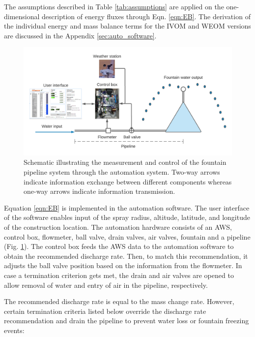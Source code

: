 The assumptions described in Table \ref{tab:assumptions} are applied on the one-dimensional description of
energy fluxes through Eqn. \ref{eqn:EB}. The derivation of the individual energy and mass balance terms for the
\ac{IVOM} and \ac{WEOM} versions are discussed in the Appendix \ref{sec:auto_software}.

\begin{figure}
\includegraphics[width=\linewidth]{figs/Automation_schematic.png}
\caption{Schematic illustrating the measurement and control of the fountain pipeline system through the
  automation system. Two-way arrows indicate information exchange between different components whereas one-way
  arrows indicate information transmission.}

\label{fig:auto_schematic} 
\end{figure}

Equation \ref{eqn:EB} is implemented in the automation software. The user interface of the software enables
input of the spray radius, altitude, latitude, and longitude of the construction location. The automation
hardware consists of an AWS, control box, flowmeter, ball valve, drain valves, air valves, fountain and a
pipeline (Fig. \ref{fig:auto_schematic}). The control box feeds the AWS data to the automation software to
obtain the recommended discharge rate. Then, to match this recommendation, it adjusts the ball valve position
based on the information from the flowmeter. In case a termination criterion gets met, the drain and air valves
are opened to allow removal of water and entry of air in the pipeline, respectively.

The recommended discharge rate is equal to the mass change rate. However, certain termination criteria listed
below override the discharge rate recommendation and drain the pipeline to prevent water loss or fountain
freezing events:

